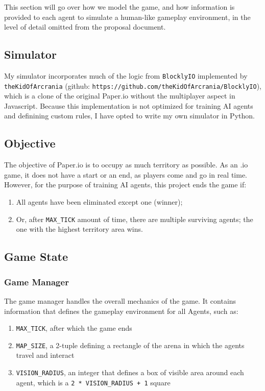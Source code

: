 \documentclass[10pt]{article}
\begin{document}
This section will go over how we model the game, and how information is provided to each agent to simulate a human-like gameplay environment, in the level of detail omitted from the proposal document.
 
\subsection{Simulator}

My simulator incorporates much of the logic from \texttt{BlocklyIO} implemented by \texttt{theKidOfArcrania} (github: \texttt{https://github.com/theKidOfArcrania/BlocklyIO}), which is a clone of the original Paper.io without the multiplayer aspect in Javascript. Because this implementation is not optimized for training AI agents and definining custom rules, I have opted to write my own simulator in Python.

\subsection{Objective}

The objective of Paper.io is to occupy as much territory as possible. As an .io game, it does not have a start or an end, as players come and go in real time. However, for the purpose of training AI agents, this project ends the game if:
\begin{enumerate}
    \item All agents have been eliminated except one (winner);
    \item Or, after \texttt{MAX\_TICK} amount of time, there are multiple surviving agents; the one with the highest territory area wins.
\end{enumerate}

\subsection{Game State}

\subsubsection{Game Manager}

The game manager handles the overall mechanics of the game. It contains information that defines the gameplay environment for all Agents, such as:

\begin{enumerate}[label=-]
    \item \texttt{MAX\_TICK}, after which the game ends
    \item \texttt{MAP\_SIZE}, a 2-tuple defining a rectangle of the arena in which the agents travel and interact
    \item \texttt{VISION\_RADIUS}, an integer that defines a box of visible area around each agent, which is a \texttt{2 * VISION\_RADIUS + 1} square
\end{enumerate}
\end{document}
